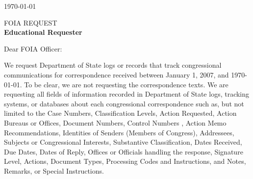 \documentclass{article}
\title{\AGENCY}
\author{Correspondence Project}
\newcommand{\AGENCY}{Department of State }
\begin{document}
\today

 
FOIA REQUEST\\
 \textbf{Educational Requester}
 
Dear FOIA Officer:
 
We request \AGENCY logs or records that track congressional communications
for correspondence received between January 1, 2007, and \today. To be clear, we are not requesting the correspondence texts. We are requesting all fields of information recorded in \AGENCY  logs, tracking systems, or databases about each congressional correspondence such as, but not limited to the Case Numbers, Classification Levels, Action Requested, Action Bureaus or Offices, Document Numbers, Control Numbers
, Action Memo Recommendations, Identities of Senders (Members of Congress), Addressees, Subjects or Congressional Interests, Substantive Classification, Dates Received, Due Dates, Dates of Reply, Offices or Officials handling the response, Signature Level, Actions, Document Types, Processing Codes and Instructions, and Notes, Remarks, or Special Instructions. 

\end{document}

